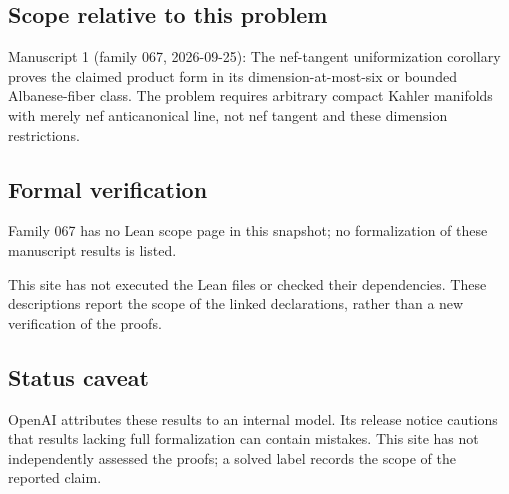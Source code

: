 \documentclass[11pt]{article}
\begin{document}
\subsection{Scope relative to this problem}
Manuscript 1 (family 067, 2026-09-25): The nef-tangent uniformization corollary proves the claimed product form in its dimension-at-most-six or bounded Albanese-fiber class. The problem requires arbitrary compact Kahler manifolds with merely nef anticanonical line, not nef tangent and these dimension restrictions.

\subsection{Formal verification}
Family 067 has no Lean scope page in this snapshot; no formalization of these manuscript results is listed.

This site has not executed the Lean files or checked their dependencies. These descriptions report the scope of the linked declarations, rather than a new verification of the proofs.

\subsection{Status caveat}
OpenAI attributes these results to an internal model. Its release notice cautions that results lacking full formalization can contain mistakes. This site has not independently assessed the proofs; a solved label records the scope of the reported claim.
\end{document}
